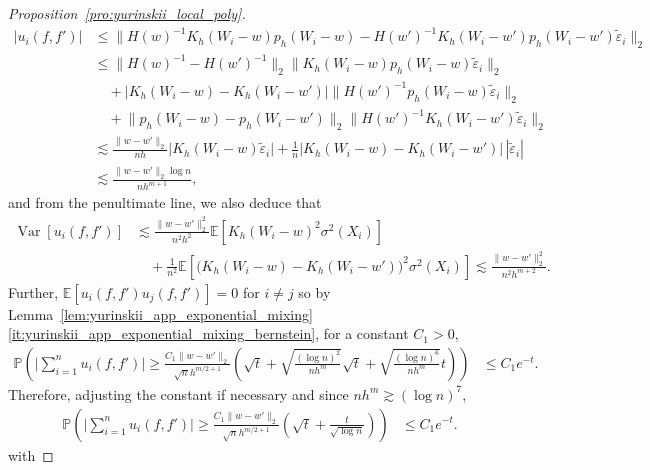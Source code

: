 \documentclass[11pt,lof]{puthesis}
\renewcommand{\P}{\ensuremath{\mathbb{P}}}
\newcommand{\E}{\ensuremath{\mathbb{E}}}
\DeclareMathOperator{\Var}{Var}
\theoremstyle{break}
\theoremstyle{proof}
\newtheorem{proof}{Proof}
\begin{document}
\begin{proof}[Proposition~\ref{pro:yurinskii_local_poly}]
\begin{align*}
    \big| u_i(f,f') \big|
    &\leq
    \big\|
    H(w)^{-1} K_h(W_i-w) p_h(W_i-w)
    - H(w')^{-1} K_h(W_i-w') p_h(W_i-w')
    \tilde\varepsilon_i
    \big\|_2 \\
    &\leq
    \big\| H(w)^{-1} - H(w')^{-1} \big\|_2
    \big\| K_h(W_i-w) p_h(W_i-w)
    \tilde\varepsilon_i
    \big\|_2 \\
    &\quad+
    \big| K_h(W_i-w) - K_h(W_i-w') \big|
    \big\| H(w')^{-1} p_h(W_i-w)
    \tilde\varepsilon_i
    \big\|_2 \\
    &\quad+
    \big\| p_h(W_i-w) - p_h(W_i-w') \big\|_2
    \big\| H(w')^{-1} K_h(W_i-w')
    \tilde\varepsilon_i \big\|_2 \\
    &\lesssim
    \frac{\|w-w'\|_2}{n h}
    \big| K_h(W_i-w) \tilde\varepsilon_i \big|
    + \frac{1}{n}
    \big| K_h(W_i-w) - K_h(W_i-w') \big|
    \,|\tilde\varepsilon_i| \\
    &\lesssim
    \frac{\|w-w'\|_2 \log n}{n h^{m+1}},
  \end{align*}
  and from the penultimate line, we also deduce that
  \begin{align*}
    \Var[u_i(f,f')]
    &\lesssim
    \frac{\|w-w'\|_2^2}{n^2h^2}
    \E\left[
      K_h(W_i-w)^2 \sigma^2(X_i)
    \right] \\
    &\quad+
    \frac{1}{n^2}
    \E\left[
      \big( K_h(W_i-w) - K_h(W_i-w') \big)^2
      \sigma^2(X_i)
    \right]
    \lesssim
    \frac{\|w-w'\|_2^2}{n^2h^{m+2}}.
  \end{align*}
  Further, $\E[u_i(f,f') u_j(f,f')] = 0$ for $i \neq j$ so
  by Lemma~\ref{lem:yurinskii_app_exponential_mixing}%
  \ref{it:yurinskii_app_exponential_mixing_bernstein},
  for a constant $C_1>0$,
  \begin{align*}
    \P\left(
      \Big| \sum_{i=1}^n u_i(f,f') \Big|
      \geq \frac{C_1 \|w-w'\|_2}{\sqrt n h^{m/2+1}}
      \left(
        \sqrt{t}
        + \sqrt{\frac{(\log n)^2}{n h^m}} \sqrt t
        + \sqrt{\frac{(\log n)^6}{n h^m}} t
      \right)
    \right)
    &\leq
    C_1 e^{-t}.
  \end{align*}
  Therefore, adjusting the constant if necessary
  and since $n h^{m} \gtrsim (\log n)^7$,
  \begin{align*}
    \P\left(
      \Big| \sum_{i=1}^n u_i(f,f') \Big|
      \geq
      \frac{C_1 \|w-w'\|_2}{\sqrt{n} h^{m/2+1}}
      \left(
        \sqrt{t} + \frac{t}{\sqrt{\log n}}
      \right)
    \right)
    &\leq
    C_1 e^{-t}.
  \end{align*}
   with

\end{proof}
\end{document}
